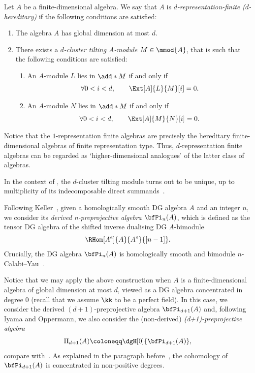 \documentclass[a4paper]{amsart}
\begin{document}
\begin{definition}[{\cite[Def.~2.2]{IO11}}]
  \label{def:d-CT_module}
  Let $A$ be a finite-dimensional algebra. We say that $A$ is
  \emph{$d$-representation-finite ($d$-hereditary)} if the following conditions
  are satisfied:
  \begin{enumerate}
  \item The algebra $A$ has global dimension at most $d$.
  \item There exists a \emph{$d$-cluster tilting $A$-module} $M\in\mmod{A}$,
    that is such that the following conditions are satisfied:
    \begin{enumerate}
    \item An $A$-module $L$ lies in $\add*{M}$ if and only if
      \[
        \forall 0<i<d,\qquad \Ext[A]{L}{M}[i]=0.
      \]
    \item An $A$-module $N$ lies in $\add*{M}$ if and only if
      \[
        \forall 0<i<d,\qquad \Ext[A]{M}{N}[i]=0.
      \]
    \end{enumerate}
  \end{enumerate}
\end{definition}

\begin{remark}
  Notice that the $1$-representation finite algebras are precisely the
  hereditary finite-dimensional algebras of finite representation type. Thus,
  $d$-re\-pre\-sen\-ta\-tion finite algebras can be regarded as
  `higher-dimensional analogues' of the latter class of algebras.
\end{remark}

\begin{remark}
  In the context of , the $d$-cluster tilting module turns
  out to be unique, up to multiplicity of its indecomposable direct
  summands~\cite[Prop.~1.3]{Iya11}.
\end{remark}

Following Keller~\cite{Kel11}, given a homologically smooth DG algebra $A$ and
an integer $n$, we consider its \emph{derived n-preprojective algebra
  $\bfPi_n(A)$}, which is defined as the tensor DG algebra of the shifted
inverse dualising DG $A$-bimodule
\[
  \RHom[A^e]{A}{A^e}{[n-1]}.
\]
Crucially, the DG algebra $\bfPi_n(A)$ is homologically smooth and bimodule
$n$-Calabi--Yau~\cite[Thm.~4.8]{Kel11}.

Notice that we may apply the above construction when $A$ is a finite-dimensional
algebra of global dimension at most $d$, viewed as a DG algebra concentrated in
degree $0$ (recall that we assume $\kk$ to be a perfect field).
In this case, we consider the derived $(d+1)$-preprojective algebra
$\bfPi_{d+1}(A)$ and, following Iyama and Oppermann, we also consider the (non-derived)
\emph{(d+1)-preprojective algebra}
\[
  \Pi_{d+1}(A)\coloneqq\dgH[0]{\bfPi_{d+1}(A)},
\]
compare with~\cite[Def.~2.11 and Rmk.~2.12]{IO13}. As explained in the paragraph
before~\cite[Cor.~4.8]{Guo11}, the cohomology of $\bfPi_{d+1}(A)$ is
concentrated in non-positive degrees.
\end{document}

